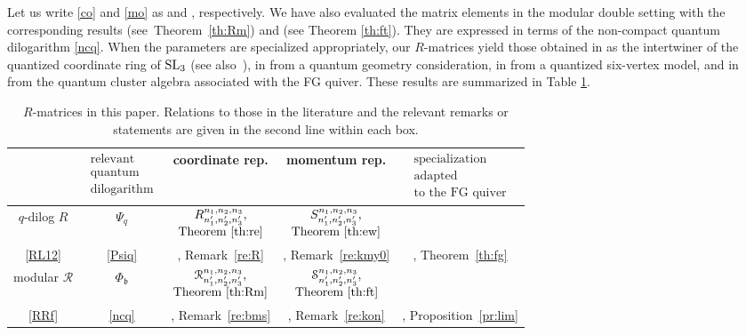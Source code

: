 \documentclass[pdftex]{sigma}
\newcommand{\bb}{{\mathfrak b}}
\numberwithin{equation}{section}
\begin{document}
Let us write \eqref{co} and \eqref{mo} as
 and
, respectively. We have also
evaluated the matrix elements in the modular double setting with the
corresponding results 
(see~Theorem~\ref{th:Rm}) and
 (see Theorem \ref{th:ft}).
They are expressed in terms of the non-compact quantum dilogarithm
\eqref{ncq}. When the parameters are specialized appropriately, our
$R$-matrices yield those obtained in \cite{KV94} as the intertwiner of
the quantized coordinate ring of ${\rm SL}_3$ (see also~\cite{BS06,K22}), in
\cite{BMS10} from a quantum geometry consideration, in \cite{KMY23}
from a quantized six-vertex model, and in~\cite{IKT1} from the quantum
cluster algebra associated with the FG quiver. These results are
summarized in Table \ref{tab:R}.

\begin{table}[h]\centering
\begin{tabular}{c|c|c|c|c}
 & $\begin{matrix} \text{relevant}\\ \text{quantum} \\
 \text{dilogarithm} \end{matrix}$ & coordinate rep. & momentum rep.
 &
$\begin{matrix} \text{specialization}\\ \text{adapted} \\
\text{to the FG quiver} \end{matrix}$\\
\hline
$q$-dilog $R$ & $\Psi_q$ &
$\begin{matrix}R^{n_1, n_2, n_3}_{n'_1,n'_2,n'_3},\\ \text{Theorem~\ref{th:re}}\end{matrix}$
&
$\begin{matrix}S^{n_1, n_2, n_3}_{n'_1,n'_2,n'_3},\\ \text{Theorem~\ref{th:ew}}\end{matrix}$
&
\\
\eqref{RL12} & \eqref{Psiq} & \cite{BS06,KV94}, Remark~\ref{re:R} & \cite{KMY23}, Remark~\ref{re:kmy0}
 &
 \cite{IKT1}, Theorem~\ref{th:fg}
\\
\hline
modular $\mathcal{R}$ & $\Phi_\bb$ &
$\begin{matrix}\mathcal{R}^{n_1, n_2, n_3}_{n'_1,n'_2,n'_3},\\ \text{Theorem~\ref{th:Rm}}\end{matrix}$
 &
$\begin{matrix}\mathcal{S}^{n_1, n_2, n_3}_{n'_1,n'_2,n'_3},\\ \text{Theorem~\ref{th:ft}}\end{matrix}$
&
\\
\eqref{RRf} & \eqref{ncq} & \cite{BMS10}, Remark~\ref{re:bms} & \cite{KMY23}, Remark~\ref{re:kon}
 &
\cite{IKT1}, Proposition~\ref{pr:lim}
\end{tabular}
\caption{$R$-matrices in this paper. Relations to those in the
 literature and the relevant remarks or statements are given in the
 second line within each box.}
\label{tab:R}
\end{table}
\end{document}
